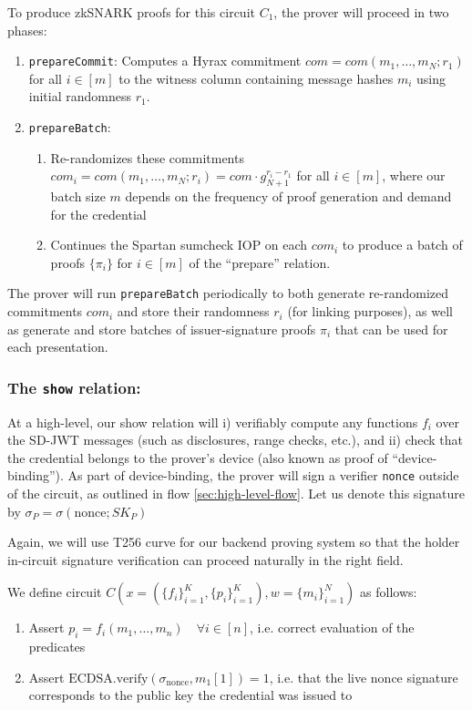 To produce zkSNARK proofs for this circuit $C_1$, the prover will proceed in two phases:
\begin{enumerate}
\item \texttt{prepareCommit}: Computes a Hyrax commitment $com = com(m_1, \dots, m_N; r_1)$ for all $i \in [m]$ to the witness column containing message hashes $m_i$ using initial randomness $r_1$. 
\item \texttt{prepareBatch}: 
    \begin{enumerate}
        \item Re-randomizes these commitments $com_i = com(m_1, \dots, m_N; r_i) = com \cdot g_{N+1}^{r_i-r_1}$ for all $i \in [m]$, 
        where our batch size $m$ depends on the frequency of proof generation and demand for the credential
        \item Continues the Spartan sumcheck IOP on each $com_i$ to produce a batch of proofs $\{\pi_i\}$ for $i \in [m]$ of the ``prepare'' relation.
    \end{enumerate}
\end{enumerate}
    
The prover will run \texttt{prepareBatch} periodically to both generate re-randomized commitments $com_i$ and store their randomness $r_i$ (for linking purposes), as well as generate and store batches of issuer-signature proofs $\pi_i$ that can be used for each presentation.

\subsubsection{The \texttt{show} relation:}

At a high-level, our show relation will i) verifiably compute any functions $f_i$ over the SD-JWT messages (such as disclosures, range checks, etc.),
and ii) check that the credential belongs to the prover's device (also known as proof of ``device-binding''). 
As part of device-binding, the prover will sign a verifier \texttt{nonce} outside of the circuit, as outlined in flow \ref{sec:high-level-flow}. 
Let us denote this signature by $\sigma_P = \sigma(\text{nonce}; SK_P)$

Again, we will use T256 curve for our backend proving system so that the holder in-circuit signature verification can proceed naturally in the right field.

\begin{mdframed}[style=zkprotocolwithheader, frametitle=Circuit $C_2$ for the \texttt{show} relation]

We define circuit $C(x = (\{f_i\}_{i=1}^K, \{p_i\}_{i=1}^K), w = \{m_i\}_{i=1}^N)$ as follows:

\begin{enumerate}
\item Assert $p_i = f_i(m_1, \dots, m_n) \quad \forall i \in [n]$, i.e. correct evaluation of the predicates
\item Assert $\text{ECDSA.verify}(\sigma_{\text{nonce}}, m_1[1]) = 1$, i.e. that the live nonce signature corresponds to the public key the credential was issued to
\end{enumerate}

\end{mdframed}

